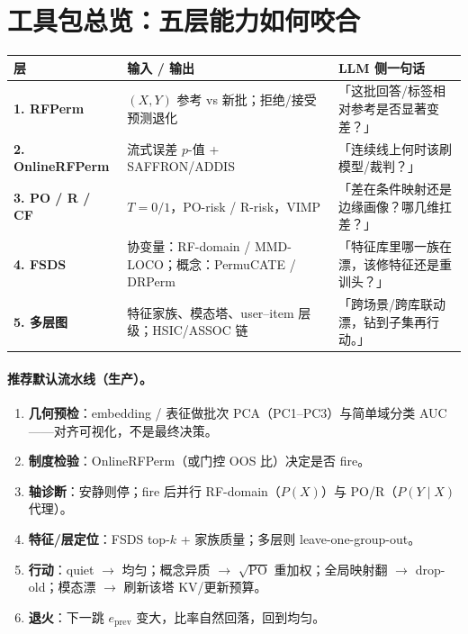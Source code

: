 \documentclass[11pt,a4paper,UTF8,fontset=none]{ctexart}
\begin{document}
\section{工具包总览：五层能力如何咬合}
\label{sec:toolkit}

\begin{center}
\begin{tabular}{@{}p{2.4cm}p{4.2cm}p{5.6cm}@{}}
\toprule
层 & 输入 / 输出 & LLM 侧一句话 \\
\midrule
\textbf{1. RFPerm} &
\((X,Y)\) 参考 vs 新批；拒绝/接受预测退化 &
「这批回答/标签相对参考是否显著变差？」 \\
\textbf{2. OnlineRFPerm} &
流式误差 \(p\)-值 + SAFFRON/ADDIS &
「连续线上何时该刷模型/裁判？」 \\
\textbf{3. PO / R / CF} &
\(T=0/1\)，PO-risk / R-risk，VIMP &
「差在条件映射还是边缘画像？哪几维扛差？」 \\
\textbf{4. FSDS} &
协变量：RF-domain / MMD-LOCO；概念：PermuCATE / DRPerm &
「特征库里哪一族在漂，该修特征还是重训头？」 \\
\textbf{5. 多层图} &
特征家族、模态塔、user--item 层级；HSIC/ASSOC 链 &
「跨场景/跨库联动漂，钻到子集再行动。」 \\
\bottomrule
\end{tabular}
\end{center}

\paragraph{推荐默认流水线（生产）。}
\begin{enumerate}
  \item \textbf{几何预检}：embedding / 表征做批次 PCA（PC1--PC3）与简单域分类 AUC——对齐可视化，不是最终决策。
  \item \textbf{制度检验}：OnlineRFPerm（或门控 OOS 比）决定是否 fire。
  \item \textbf{轴诊断}：安静则停；fire 后并行 RF-domain（\(P(X)\)）与 PO/R（\(P(Y\mid X)\) 代理）。
  \item \textbf{特征/层定位}：FSDS top-\(k\) + 家族质量；多层则 leave-one-group-out。
  \item \textbf{行动}：quiet \(\to\) 均匀；概念异质 \(\to\) \(\sqrt{\mathrm{PO}}\) 重加权；全局映射翻 \(\to\) drop-old；模态漂 \(\to\) 刷新该塔 KV/更新预算。
  \item \textbf{退火}：下一跳 \(e_{\mathrm{prev}}\) 变大，比率自然回落，回到均匀。
\end{enumerate}
\end{document}
